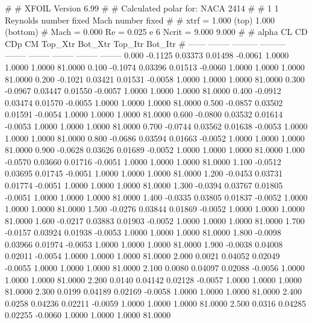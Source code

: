 #  
#       XFOIL         Version 6.99
#  
# Calculated polar for: NACA 2414                                       
#  
# 1 1 Reynolds number fixed          Mach number fixed         
#  
# xtrf =   1.000 (top)        1.000 (bottom)  
# Mach =   0.000     Re =     0.025 e 6     Ncrit =   9.000  9.000
#  
#   alpha    CL        CD       CDp       CM     Top_Xtr  Bot_Xtr  Top_Itr  Bot_Itr
#  ------ -------- --------- --------- -------- -------- -------- -------- --------
   0.000  -0.1125   0.03373   0.01498  -0.0061   1.0000   1.0000   1.0000  81.0000
   0.100  -0.1074   0.03396   0.01513  -0.0060   1.0000   1.0000   1.0000  81.0000
   0.200  -0.1021   0.03421   0.01531  -0.0058   1.0000   1.0000   1.0000  81.0000
   0.300  -0.0967   0.03447   0.01550  -0.0057   1.0000   1.0000   1.0000  81.0000
   0.400  -0.0912   0.03474   0.01570  -0.0055   1.0000   1.0000   1.0000  81.0000
   0.500  -0.0857   0.03502   0.01591  -0.0054   1.0000   1.0000   1.0000  81.0000
   0.600  -0.0800   0.03532   0.01614  -0.0053   1.0000   1.0000   1.0000  81.0000
   0.700  -0.0744   0.03562   0.01638  -0.0053   1.0000   1.0000   1.0000  81.0000
   0.800  -0.0686   0.03594   0.01663  -0.0052   1.0000   1.0000   1.0000  81.0000
   0.900  -0.0628   0.03626   0.01689  -0.0052   1.0000   1.0000   1.0000  81.0000
   1.000  -0.0570   0.03660   0.01716  -0.0051   1.0000   1.0000   1.0000  81.0000
   1.100  -0.0512   0.03695   0.01745  -0.0051   1.0000   1.0000   1.0000  81.0000
   1.200  -0.0453   0.03731   0.01774  -0.0051   1.0000   1.0000   1.0000  81.0000
   1.300  -0.0394   0.03767   0.01805  -0.0051   1.0000   1.0000   1.0000  81.0000
   1.400  -0.0335   0.03805   0.01837  -0.0052   1.0000   1.0000   1.0000  81.0000
   1.500  -0.0276   0.03844   0.01869  -0.0052   1.0000   1.0000   1.0000  81.0000
   1.600  -0.0217   0.03883   0.01903  -0.0052   1.0000   1.0000   1.0000  81.0000
   1.700  -0.0157   0.03924   0.01938  -0.0053   1.0000   1.0000   1.0000  81.0000
   1.800  -0.0098   0.03966   0.01974  -0.0053   1.0000   1.0000   1.0000  81.0000
   1.900  -0.0038   0.04008   0.02011  -0.0054   1.0000   1.0000   1.0000  81.0000
   2.000   0.0021   0.04052   0.02049  -0.0055   1.0000   1.0000   1.0000  81.0000
   2.100   0.0080   0.04097   0.02088  -0.0056   1.0000   1.0000   1.0000  81.0000
   2.200   0.0140   0.04142   0.02128  -0.0057   1.0000   1.0000   1.0000  81.0000
   2.300   0.0199   0.04189   0.02169  -0.0058   1.0000   1.0000   1.0000  81.0000
   2.400   0.0258   0.04236   0.02211  -0.0059   1.0000   1.0000   1.0000  81.0000
   2.500   0.0316   0.04285   0.02255  -0.0060   1.0000   1.0000   1.0000  81.0000
